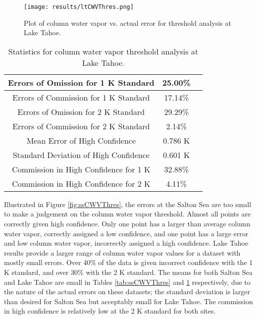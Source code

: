 \documentclass{book}
\begin{document}
\begin{minipage}[c]{0.47\textwidth}
\centering
\begin{figure}[H]
\texttt{[image: results/ltCWVThres.png]}
\caption{Plot of column water vapor vs. actual error for threshold analysis at Lake Tahoe.}
\label{fig:ltCWVThres}
\end{figure}
\end{minipage}
\begin{minipage}[c]{0.47\textwidth}
\begin{table}[H]
\centering
\footnotesize
\begin{tabular}{ | c | c | c | } \hline
Errors of Omission for 1 K Standard & 25.00\% \\ \hline
Errors of Commission for 1 K Standard & 17.14\% \\ \hline
Errors of Omission for 2 K Standard & 29.29\% \\ \hline
Errors of Commission for 2 K Standard & 2.14\% \\ \hline
Mean Error of High Confidence & 0.786 K \\ \hline
Standard Deviation of High Confidence & 0.601 K \\ \hline
Commission in High Confidence for 1 K & 32.88\% \\ \hline
Commission in High Confidence for 2 K & 4.11\% \\ \hline
\end{tabular}
\caption{Statistics for column water vapor threshold analysis at Lake Tahoe.}
\label{tab:ltCWVThres}
\end{table}
\end{minipage}

Illustrated in Figure \ref{fig:ssCWVThres}, the errors at the Salton Sea are too small to make a judgement on the column water vapor threshold.  Almost all points are correctly given high confidence.  Only one point has a larger than average column water vapor, correctly assigned a low confidence, and one point has a large error and low column water vapor, incorrectly assigned a high confidence.  Lake Tahoe results provide a larger range of column water vapor values for a dataset with mostly small errors.  Over 40\% of the data is given incorrect confidence with the 1 K standard, and over 30\% with the 2 K standard.  The means for both Salton Sea and Lake Tahoe are small in Tables \ref{tab:ssCWVThres} and \ref{tab:ltCWVThres} respectively, due to the nature of the actual errors on these datasets; the standard deviation is larger than desired for Salton Sea but acceptably small for Lake Tahoe.  The commission in high confidence is relatively low at the 2 K standard for both sites.
\end{document}
